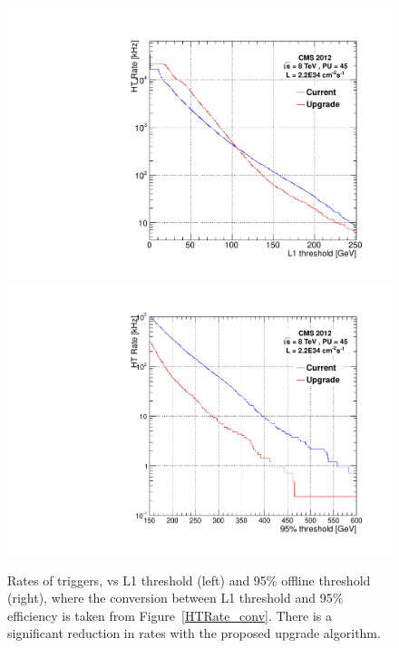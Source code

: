 \begin{figure}[t!]
\begin{center}
  \includegraphics[scale=0.3]{Figures/l1jets/HTRates_2e34.pdf}
    \includegraphics[scale=0.3]{Figures/l1jets/HTRates_95thresh_2e34.pdf}
\caption{Rates of \HT triggers, vs \ac{L1} threshold (left) and 95\% offline threshold (right), where the conversion between \ac{L1} threshold and 95\% efficiency is taken from Figure~\ref{HTRate_conv}. There is a significant reduction in rates with the proposed upgrade algorithm.}
\label{HTRate}
\end{center}
\end{figure}

 

